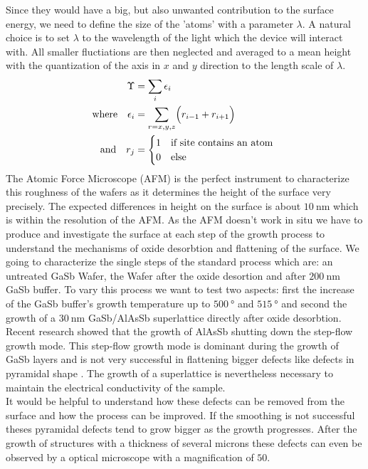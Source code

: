 Since they would have a big, but also unwanted contribution to the surface 
energy, we need to define the size of the 'atoms' with a parameter $\lambda$.
A natural choice is to set $\lambda$ to the wavelength of the light which the 
device will interact with. All smaller fluctiations are then neglected and 
averaged to a mean height with the quantization of the axis in $x$ and $y$ 
direction to the length scale of $\lambda$.
\begin{align}
    \Upsilon &=  \sum_i \epsilon_i \hfill ~ \\
    \text{where} \quad 
    \epsilon_i &=  \sum_{r=x,y,z} \Bigl( r_{i-1} + r_{i+1} \Bigr) \\
    \text{and}  \quad 
    r_j &=    \begin{cases}
                1 &\mbox{if site contains an atom } \\
                0 &\mbox{else }
            \end{cases}
\end{align}
The Atomic Force Microscope (AFM) is the perfect instrument to characterize this roughness of the wafers as it determines the height of the surface very precisely. The expected differences in height on the surface is about $\SI{10}{\nano\meter}$ which is within the resolution of the AFM.
As the AFM doesn't work in situ we have to produce and investigate the surface at each step of the growth process to understand the mechanisms of oxide desorbtion and flattening of the surface. We going to characterize the single steps of the standard process which are: an untreated GaSb Wafer, the Wafer after the oxide desortion and after $\SI{200}{\nano\meter}$ GaSb buffer. To vary this process we want to test two aspects: first the increase of the GaSb buffer's growth temperature up to $\SI{500}{\degree}$ and $\SI{515}{\degree}$ and second the growth of a $\SI{30}{\nano\meter}$ GaSb/AlAsSb superlattice directly after oxide desorbtion. Recent research showed that the growth of AlAsSb shutting down the step-flow growth mode. This  step-flow growth mode is dominant during the growth of GaSb layers and is not very successful in flattening bigger defects like defects in pyramidal shape \cite{murray}. The growth of a superlattice is nevertheless necessary to maintain the electrical conductivity of the sample.\\
It would be helpful to understand how these defects can be removed from the surface and how the process can be improved. If the smoothing is not successful theses pyramidal defects tend to grow bigger as the growth progresses. After the growth of structures with a thickness of several microns these defects can even be observed by a optical microscope with a magnification of $50$.
